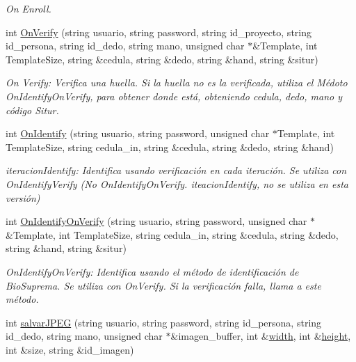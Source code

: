 \begin{DoxyCompactItemize}
\begin{DoxyCompactList}\small\item\em On Enroll. \end{DoxyCompactList}\item 
int \hyperlink{classTemplateAFIS__webservice_ad2d94adf36b56bf3306e52e5e20ecaab}{On\+Verify} (string usuario, string password, string id\+\_\+proyecto, string id\+\_\+persona, string id\+\_\+dedo, string mano, unsigned char $\ast$\&Template, int Template\+Size, string \&cedula, string \&dedo, string \&hand, string \&situr)
\begin{DoxyCompactList}\small\item\em On Verify\+: Verifica una huella. Si la huella no es la verificada, utiliza el Médoto On\+Identify\+On\+Verify, para obtener donde está, obteniendo cedula, dedo, mano y código Situr. \end{DoxyCompactList}\item 
int \hyperlink{classTemplateAFIS__webservice_ab66286f0a3f0702977a46332d3bce05d}{On\+Identify} (string usuario, string password, unsigned char $\ast$Template, int Template\+Size, string cedula\+\_\+in, string \&cedula, string \&dedo, string \&hand)
\begin{DoxyCompactList}\small\item\em iteracion\+Identify\+: Identifica usando verificación en cada iteración. Se utiliza con On\+Identify\+Verify (No On\+Identify\+On\+Verify. iteacion\+Identify, no se utiliza en esta versión) \end{DoxyCompactList}\item 
int \hyperlink{classTemplateAFIS__webservice_a2c62949a4ec904bfc4571d95d577ddb4}{On\+Identify\+On\+Verify} (string usuario, string password, unsigned char $\ast$\&Template, int Template\+Size, string cedula\+\_\+in, string \&cedula, string \&dedo, string \&hand, string \&situr)
\begin{DoxyCompactList}\small\item\em On\+Identify\+On\+Verify\+: Identifica usando el método de identificación de Bio\+Suprema. Se utiliza con On\+Verify. Si la verificación falla, llama a este método. \end{DoxyCompactList}\item 
int \hyperlink{classTemplateAFIS__webservice_a8e3f9279cbfd23a0a89d62c19ddd007c}{salvar\+J\+P\+EG} (string usuario, string password, string id\+\_\+persona, string id\+\_\+dedo, string mano, unsigned char $\ast$\&imagen\+\_\+buffer, int \&\hyperlink{librawjpeg_8cpp_a2474a5474cbff19523a51eb1de01cda4}{width}, int \&\hyperlink{librawjpeg_8cpp_ad12fc34ce789bce6c8a05d8a17138534}{height}, int \&size, string \&id\+\_\+imagen)

\end{DoxyCompactItemize}

